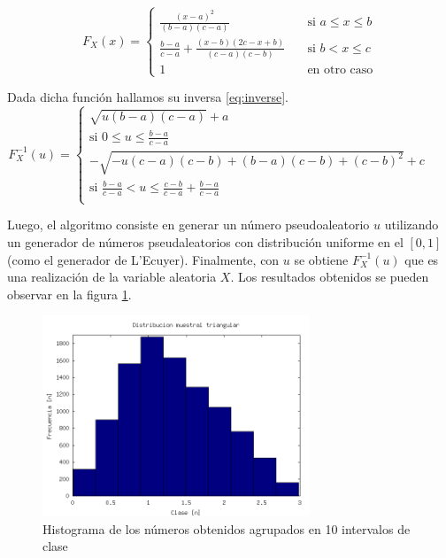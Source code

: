 \documentclass{sig-alternate}
\begin{document}
\begin{equation}
\label{eq:triangleDistribution}
F_{X}(x) =
\begin{cases}
\frac{(x-a)^{2}}{(b-a)(c-a)} \quad & \text{si } a \leq x \leq b \\
\frac{b-a}{c-a} + \frac{(x-b)(2c-x+b)}{(c-a)(c-b)} \quad & \text{si } b < x \leq c \\
1 \quad & \text{en otro caso}
\end{cases}
\end{equation}

Dada dicha funci\'on hallamos su inversa \eqref{eq:inverse}.\\

\begin{equation}
\label{eq:inverse}
F^{-1}_{X}(u) =
\begin{cases}
\sqrt{u(b-a)(c-a)}+a \quad & \\
\text{si } 0 \leq u \leq \frac{b-a}{c-a} & \\
-\sqrt{-u(c-a)(c-b)+(b-a)(c-b)+(c-b)^{2}} + c \quad & \\
\text{si } \frac{b-a}{c-a} < u \leq \frac{c-b}{c-a}+\frac{b-a}{c-a} \\
\end{cases}
\end{equation}

Luego, el algoritmo consiste en generar un n\'umero pseudoaleatorio $u$ utilizando
un generador de n\'umeros pseudaleatorios con distribuci\'on uniforme en el $[0,1]$ (como el generador de L'Ecuyer).
Finalmente, con $u$ se obtiene $F^{-1}_{X}(u)$ que es una realizaci\'on de la variable aleatoria $X$.
Los resultados obtenidos se pueden observar en la figura \ref{fig:triangle}.

\begin{figure}[ht]
\label{fig:triangle}
\includegraphics[width=8cm]{histograma_triangular}
\caption{Histograma de los n\'umeros obtenidos agrupados en 10 intervalos de clase}
\end{figure}
\end{document}
